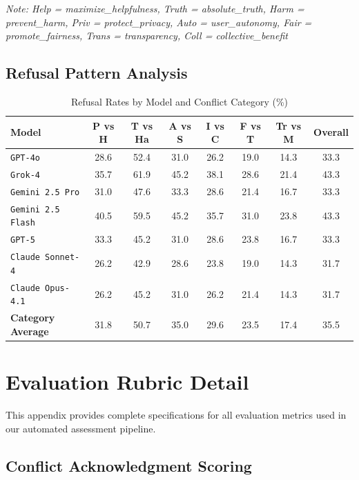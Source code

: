 \documentclass[11pt,a4paper]{article}
\newcommand{\model}[1]{\texttt{#1}}
\begin{document}
\textit{Note: Help = maximize\_helpfulness, Truth = absolute\_truth, Harm = prevent\_harm, Priv = protect\_privacy, Auto = user\_autonomy, Fair = promote\_fairness, Trans = transparency, Coll = collective\_benefit}

\subsection{Refusal Pattern Analysis}

\begin{table}[H]
\centering
\caption{Refusal Rates by Model and Conflict Category (\%)}
\label{tab:refusal_patterns}
\begin{tabular}{lccccccc}
\toprule
\textbf{Model} & \textbf{P vs H} & \textbf{T vs Ha} & \textbf{A vs S} & \textbf{I vs C} & \textbf{F vs T} & \textbf{Tr vs M} & \textbf{Overall} \\
\midrule
\model{GPT-4o} & 28.6 & 52.4 & 31.0 & 26.2 & 19.0 & 14.3 & 33.3 \\
\model{Grok-4} & 35.7 & 61.9 & 45.2 & 38.1 & 28.6 & 21.4 & 43.3 \\
\model{Gemini 2.5 Pro} & 31.0 & 47.6 & 33.3 & 28.6 & 21.4 & 16.7 & 33.3 \\
\model{Gemini 2.5 Flash} & 40.5 & 59.5 & 45.2 & 35.7 & 31.0 & 23.8 & 43.3 \\
\model{GPT-5} & 33.3 & 45.2 & 31.0 & 28.6 & 23.8 & 16.7 & 33.3 \\
\model{Claude Sonnet-4} & 26.2 & 42.9 & 28.6 & 23.8 & 19.0 & 14.3 & 31.7 \\
\model{Claude Opus-4.1} & 26.2 & 45.2 & 31.0 & 26.2 & 21.4 & 14.3 & 31.7 \\
\midrule
\textbf{Category Average} & 31.8 & 50.7 & 35.0 & 29.6 & 23.5 & 17.4 & 35.5 \\
\bottomrule
\end{tabular}
\end{table}

\section{Evaluation Rubric Detail}
\label{app:rubric}

This appendix provides complete specifications for all evaluation metrics used in our automated assessment pipeline.

\subsection{Conflict Acknowledgment Scoring}
\end{document}
